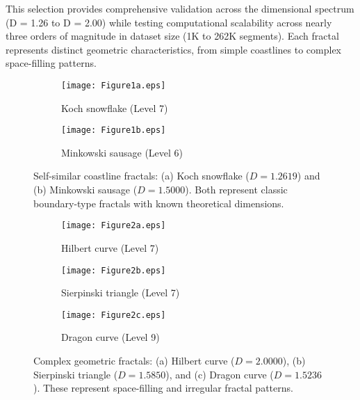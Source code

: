 \documentclass[preprint,12pt]{elsarticle}
\begin{document}
This selection provides comprehensive validation across the dimensional spectrum (D = 1.26 to D = 2.00) while testing computational scalability across nearly three orders of magnitude in dataset size (1K to 262K segments). Each fractal represents distinct geometric characteristics, from simple coastlines to complex space-filling patterns.

\begin{figure}[tbp]
\centering
\begin{subfigure}[b]{0.8\textwidth}
    \centering
    \texttt{[image: Figure1a.eps]}
    \caption{Koch snowflake (Level 7)}
    \label{fig:koch_fractal}
\end{subfigure}

\vspace{0.5cm}

\begin{subfigure}[b]{0.8\textwidth}
    \centering
    \texttt{[image: Figure1b.eps]}
    \caption{Minkowski sausage (Level 6)}
    \label{fig:minkowski_fractal}
\end{subfigure}
\caption{Self-similar coastline fractals: (a) Koch snowflake ($D = 1.2619$) and (b) Minkowski sausage ($D = 1.5000$). Both represent classic boundary-type fractals with known theoretical dimensions.}
\label{fig:coastline_fractals}
\end{figure}

\begin{figure}[tbp]
\centering
\begin{subfigure}[b]{0.48\textwidth}
    \centering
    \texttt{[image: Figure2a.eps]}
    \caption{Hilbert curve (Level 7)}
    \label{fig:hilbert_fractal}
\end{subfigure}
\hfill
\begin{subfigure}[b]{0.48\textwidth}
    \centering
    \texttt{[image: Figure2b.eps]}
    \caption{Sierpinski triangle (Level 7)}
    \label{fig:sierpinski_fractal}
\end{subfigure}

\vspace{0.4cm}

\begin{subfigure}[b]{0.480\textwidth}
    \centering
    \texttt{[image: Figure2c.eps]}
    \caption{Dragon curve (Level 9)}
    \label{fig:dragon_fractal}
\end{subfigure}

\caption{Complex geometric fractals: (a) Hilbert curve ($D = 2.0000$), (b) Sierpinski triangle ($D = 1.5850$), and (c) Dragon curve ($D = 1.5236$). These represent space-filling and irregular fractal patterns.}
\label{fig:complex_fractals}
\end{figure}
\end{document}
